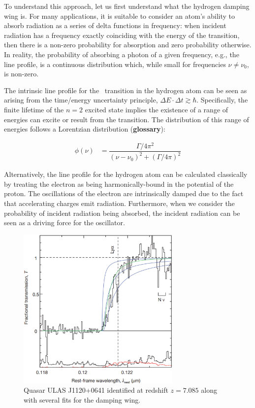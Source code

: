 To understand this approach, let us first understand what the hydrogen damping wing is. For many applications, it is suitable to consider an atom's ability to absorb radiation as a series of delta functions in frequency: when incident radiation has a frequency exactly coinciding with the energy of the transition, then there is a non-zero probability for absorption and zero probability otherwise. In reality, the probability of absorbing a photon of a given frequency, e.g., the line profile, is a continuous distribution which, while small for frequencies $\nu \neq \nu_{0}$, is non-zero. 


The intrinsic line profile for the \lya\ transition in the hydrogen atom can be seen as arising from the time/energy uncertainty principle, $\Delta E \cdot \Delta t \gtrsim \hbar$. Specifically, the finite lifetime of the $n = 2$ excited state implies the existence of a range of energies can excite or result from the transition. The distribution of this range of energies follows a Lorentzian distribution ({\bf glossary}):

\begin{align}
\phi(\nu) &= \dfrac{\Gamma/4\pi^{2}}{(\nu - \nu_{0})^{2} + (\Gamma/4\pi)^2}
\end{align}

Alternatively, the line profile for the hydrogen atom can be calculated classically by treating the electron as being harmonically-bound in the potential of the proton. The oscillations of the electron are intrinsically damped due to the fact that accelerating charges emit radiation. Furthermore, when we consider the probability of incident radiation being absorbed, the incident radiation can be seen as a driving force for the oscillator. 




\begin{figure}[h]
  \centering
  \includegraphics[width=8cm]{z7p085_DampingWing.eps}
  \caption{Quasar ULAS J1120+0641 identified at redshift $z = 7.085$ along with several fits for the damping wing.}
  \label{fig:Chornock}
\end{figure}



